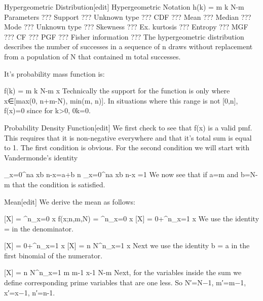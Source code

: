 Hypergeometric Distribution[edit]
Hypergeometric
Notation	h(k) = {{{m \choose k} {{N-m} }}} 
Parameters	 ???
Support	 ???
Unknown type	 ???
CDF	 ???
Mean	 ???
Median	 ???
Mode	 ???
Unknown type	 ???
Skewness	 ???
Ex. kurtosis	 ???
Entropy	 ???
MGF	 ???
CF	 ???
PGF	 ???
Fisher information	 ???
The hypergeometric distribution describes the number of successes in a sequence of n draws without replacement from a population of N that contained m total successes.

It's probability mass function is:

f(k) = {{{m \choose k} {{N-m} }}}x \in[0,n]
Technically the support for the function is only where x∈[max(0, n+m-N), min(m, n)]. In situations where this range is not [0,n], f(x)=0 since for k>0, {0\choose k}=0.

Probability Density Function[edit]
We first check to see that f(x) is a valid pmf. This requires that it is non-negative everywhere and that it's total sum is equal to 1. The first condition is obvious. For the second condition we will start with Vandermonde's identity

\sum_{x=0}^n{a \choose x}{b \choose n-x}={a+b \choose n}
\sum_{x=0}^n{{a \choose x}{b \choose n-x} }=1
We now see that if a=m and b=N-m that the condition is satisfied.

Mean[edit]
We derive the mean as follows:

[X] = \sum^n_{x=0} x \cdot f(x;n,m,N)  = \sum^n_{x=0} x 
[X] = 0+\sum^n_{x=1} x 
We use the identity   =   in the denominator.

[X] = 0+\sum^n_{x=1} x 
[X] = {n \over N}\sum^n_{x=1} x 
Next we use the identity b  = a  in the first binomial of the numerator.

[X] = {n \over N}\sum^n_{x=1} {m {{m-1 \choose x-1} {{N-m} }}}
Next, for the variables inside the sum we define corresponding prime variables that are one less. So N′=N−1, m′=m−1, x′=x−1, n′=n-1.

